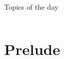 
\begin{frame}
    \titlepage
\end{frame}
\makeatletter
    \setcounter{section}{-1\relax}%
    \relax\space
\makeatother
\begin{frame}[label=toc,plain,noframenumbering]{Topics of the day}
    \medskip
    \begin{columns}[t]
        \begin{column}{.45\textwidth}
            \hspace*{4mm}
            \begin{minipage}[t][0.6\textheight]{\textwidth}
                \begin{NoHyper}
                    \tableofcontents[currentsection,sections={0}]
                \end{NoHyper}
                \vspace{-7.7mm}
                \tableofcontents[sections={1-3}]
            \end{minipage}
        \end{column}
        \begin{column}{.45\textwidth}
            \begin{minipage}[t][0.6\textheight]{\textwidth}
                \tableofcontents[sections={4-}]
            \end{minipage}
        \end{column}
    \end{columns}
\end{frame}
\section{Prelude} %
